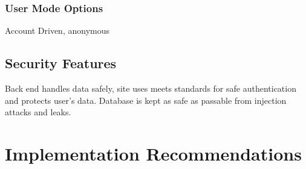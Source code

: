 \documentclass[]{article}
\begin{document}
\subsubsection{User Mode Options}
Account Driven, anonymous 

\subsection{Security Features}
Back end handles data safely, site uses meets standards for safe authentication and protects user's data. Database is kept as safe as passable from injection attacks and leaks. 



\section{Implementation Recommendations}
\end{document}
